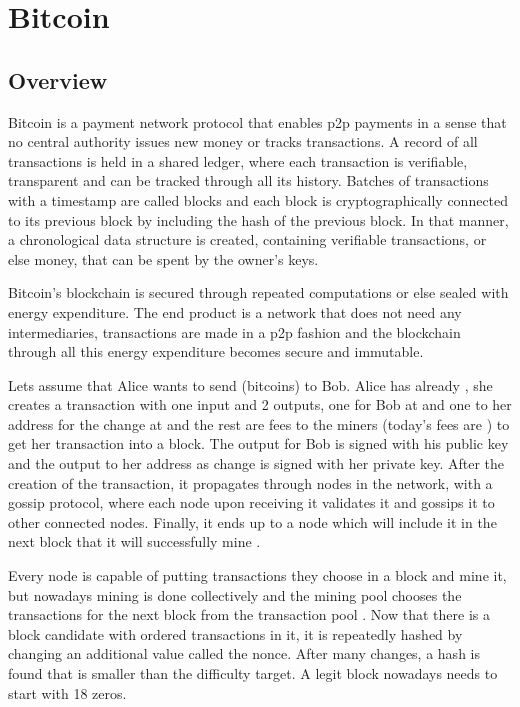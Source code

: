 \section{Bitcoin}
\subsection{Overview}
Bitcoin is a payment network protocol that enables \acrshort{p2p} payments in a sense that no central authority issues new money or tracks transactions. A record of all transactions is held in a shared ledger, where each transaction is verifiable, transparent and can be tracked through all its history. Batches of transactions with a timestamp are called blocks and each block is cryptographically connected to its previous block by including the hash of the previous block. In that manner, a chronological data structure is created, containing verifiable transactions, or else money, that can be spent by the owner's keys. 

Bitcoin's blockchain is secured through repeated computations or else sealed with energy expenditure. The end product is a network that does not need any intermediaries, transactions are made in a \acrshort{p2p} fashion and the blockchain through all this energy expenditure becomes secure and immutable.   


Lets assume that Alice wants to send  (bitcoins) to Bob. Alice has already , she creates a transaction with one input and 2 outputs, one for Bob at  and one to her address for the change at  and the rest  are fees to the miners (today's fees are )\cite{btcfees} to get her transaction into a block. The output for Bob is signed with his public key and the output to her address as change is signed with her private key. After the creation of the transaction, it propagates through nodes in the network, with a gossip protocol, where each node upon receiving it validates it and gossips it to other connected nodes. Finally, it ends up to a node which will include it in the next block that it will successfully mine \cite{btc-wiki-transaction}.

Every node is capable of putting transactions they choose in a block and mine it, but nowadays mining is done collectively and the mining pool chooses the transactions for the next block from the transaction pool \cite{pool-statistics}. Now that there is a block candidate with ordered transactions in it, it is repeatedly hashed by changing an additional value called the nonce. After many changes, a hash is found that is smaller than the difficulty target. A legit block nowadays needs to start with 18 zeros. 

